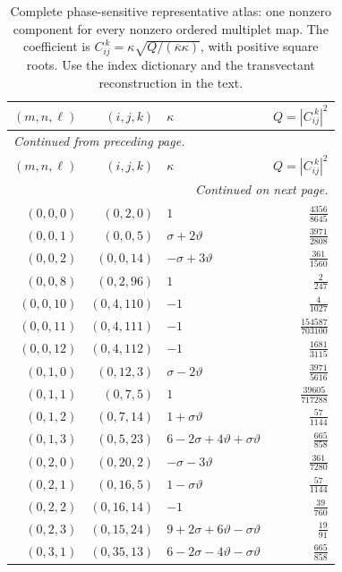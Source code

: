 \begingroup\small
\setlength{\tabcolsep}{5pt}
\begin{longtable}{rrlr}
\caption{Complete phase-sensitive representative atlas: one nonzero component for every nonzero ordered multiplet map. The coefficient is $C_{ij}^{\ k}=\kappa\sqrt{Q/(\overline\kappa\kappa)}$, with positive square roots. Use the index dictionary and the transvectant reconstruction in the text.}\label{expphysics:coupling-atlas}\\
\toprule
$(m,n,\ell)$ & $(i,j,k)$ & $\kappa$ & $Q=|C_{ij}^{\ k}|^2$\\
\midrule
\endfirsthead
\multicolumn{4}{l}{\small\itshape Continued from preceding page.}\\
\toprule
$(m,n,\ell)$ & $(i,j,k)$ & $\kappa$ & $Q=|C_{ij}^{\ k}|^2$\\
\midrule
\endhead
\midrule
\multicolumn{4}{r}{\small\itshape Continued on next page.}\\
\endfoot
\bottomrule
\endlastfoot
$(0,0,0)$ & $(0,2,0)$ & $1$ & $\frac{4356}{8645}$\\
$(0,0,1)$ & $(0,0,5)$ & $\sigma+2\vartheta$ & $\frac{3971}{2808}$\\
$(0,0,2)$ & $(0,0,14)$ & $-\sigma+3\vartheta$ & $\frac{361}{1560}$\\
$(0,0,8)$ & $(0,2,96)$ & $1$ & $\frac{2}{247}$\\
$(0,0,10)$ & $(0,4,110)$ & $-1$ & $\frac{4}{1027}$\\
$(0,0,11)$ & $(0,4,111)$ & $-1$ & $\frac{154587}{703100}$\\
$(0,0,12)$ & $(0,4,112)$ & $-1$ & $\frac{1681}{3115}$\\
$(0,1,0)$ & $(0,12,3)$ & $\sigma-2\vartheta$ & $\frac{3971}{5616}$\\
$(0,1,1)$ & $(0,7,5)$ & $1$ & $\frac{39605}{717288}$\\
$(0,1,2)$ & $(0,7,14)$ & $1+\sigma\vartheta$ & $\frac{57}{1144}$\\
$(0,1,3)$ & $(0,5,23)$ & $6-2\sigma+4\vartheta+\sigma\vartheta$ & $\frac{665}{858}$\\
$(0,2,0)$ & $(0,20,2)$ & $-\sigma-3\vartheta$ & $\frac{361}{7280}$\\
$(0,2,1)$ & $(0,16,5)$ & $1-\sigma\vartheta$ & $\frac{57}{1144}$\\
$(0,2,2)$ & $(0,16,14)$ & $-1$ & $\frac{39}{760}$\\
$(0,2,3)$ & $(0,15,24)$ & $9+2\sigma+6\vartheta-\sigma\vartheta$ & $\frac{19}{91}$\\
$(0,3,1)$ & $(0,35,13)$ & $6-2\sigma-4\vartheta-\sigma\vartheta$ & $\frac{665}{858}$\\

\end{longtable}
